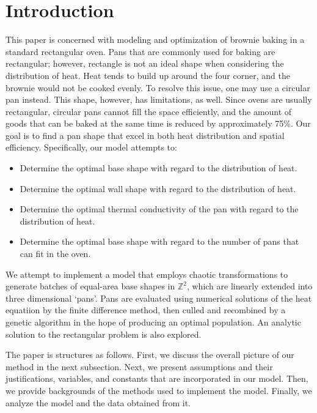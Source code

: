 \documentclass[12pt,draft]{reedmcm}
\begin{document}
\maketitle
\tableofcontents
\listoffigures

\section{Introduction}
This paper is concerned with modeling and optimization of brownie baking in a standard rectangular oven.
Pans that are commonly used for baking are rectangular; however, rectangle is not an ideal shape when considering the distribution of heat.
Heat tends to build up around the four corner, and the brownie would not be cooked evenly.
To resolve this issue, one may use a circular pan instead.
This shape, however, has limitations, as well.
Since ovens are usually rectangular, circular pans cannot fill the space efficiently, and the amount of goods that can be baked at the same time is reduced by approximately 75\%.
Our goal is to find a pan shape that excel in both heat distribution and spatial efficiency.
Specifically, our model attempts to:
\begin{itemize}
  \item Determine the optimal base shape with regard to the distribution of heat.
  \item Determine the optimal wall shape with regard to the distribution of heat.
  \item Determine the optimal thermal conductivity of the pan with regard to the distribution of heat.
  \item Determine the optimal base shape with regard to the number of pans that can fit in the oven.
\end{itemize}
We attempt to implement a model that employs chaotic transformations to generate batches of equal-area base shapes in $\mathbb{Z}^2$, which are linearly extended into three dimensional `pans'.
Pans are evaluated using numerical solutions of the heat equatiion by the finite difference method, then culled and recombined by a genetic algorithm in the hope of producing an optimal population. 
An analytic solution to the rectangular problem is also explored.

The paper is structures as follows.
First, we discuss the overall picture of our method in the next subsection.
Next, we present assumptions and their justifications, variables, and constants that are incorporated in our model.
Then, we provide backgrounds of the methods used to implement the model.
Finally, we analyze the model and the data obtained from it.
\end{document}
